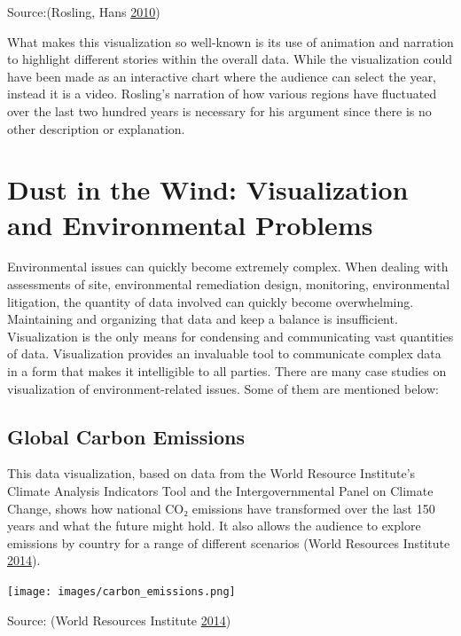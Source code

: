 \documentclass[]{book}
\begin{document}
Source:(Rosling, Hans \protect\hyperlink{ref-hans_rosling}{2010})

What makes this visualization so well-known is its use of animation and narration to highlight different stories within the overall data. While the visualization could have been made as an interactive chart where the audience can select the year, instead it is a video. Rosling's narration of how various regions have fluctuated over the last two hundred years is necessary for his argument since there is no other description or explanation.

\hypertarget{dust-in-the-wind-visualization-and-environmental-problems}{%
\section{Dust in the Wind: Visualization and Environmental Problems}\label{dust-in-the-wind-visualization-and-environmental-problems}}

Environmental issues can quickly become extremely complex. When dealing with assessments of site, environmental remediation design, monitoring, environmental litigation, the quantity of data involved can quickly become overwhelming. Maintaining and organizing that data and keep a balance is insufficient. Visualization is the only means for condensing and communicating vast quantities of data. Visualization provides an invaluable tool to communicate complex data in a form that makes it intelligible to all parties. There are many case studies on visualization of environment-related issues. Some of them are mentioned below:

\hypertarget{global-carbon-emissions}{%
\subsection{Global Carbon Emissions}\label{global-carbon-emissions}}

This data visualization, based on data from the World Resource Institute's Climate Analysis Indicators Tool and the Intergovernmental Panel on Climate Change, shows how national CO₂ emissions have transformed over the last 150 years and what the future might hold. It also allows the audience to explore emissions by country for a range of different scenarios (World Resources Institute \protect\hyperlink{ref-CO2_emission}{2014}).

\texttt{[image: images/carbon\_emissions.png]}

Source: (World Resources Institute \protect\hyperlink{ref-CO2_emission}{2014})
\end{document}
